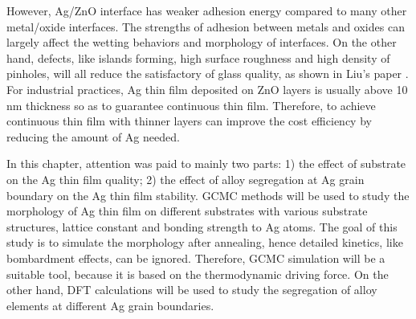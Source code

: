 However, Ag/ZnO interface has weaker adhesion energy compared to many other metal/oxide interfaces. The strengths of adhesion between metals and oxides can largely affect the wetting behaviors and morphology of interfaces. On the other hand, defects, like islands forming, high surface roughness and high density of pinholes, will all reduce the satisfactory of glass quality, as shown in Liu's paper \cite{liu2013lithography}. For industrial practices, Ag thin film deposited on ZnO layers is usually above 10 nm thickness so as to guarantee continuous thin film. Therefore, to achieve continuous thin film with thinner layers can improve the cost efficiency by reducing the amount of Ag needed.

In this chapter, attention was paid to mainly two parts: 1) the effect of substrate on the Ag thin film quality; 2) the effect of alloy segregation at Ag grain boundary on the Ag thin film stability. \ac{GCMC} methods will be used to study the morphology of Ag thin film on different substrates with various substrate structures, lattice constant and bonding strength to Ag atoms. The goal of this study is to simulate the morphology after annealing, hence detailed kinetics, like bombardment effects, can be ignored. Therefore, \ac{GCMC} simulation will be a suitable tool, because it is based on the thermodynamic driving force. On the other hand, \ac{DFT} calculations will be used to study the segregation of alloy elements at different Ag grain boundaries.